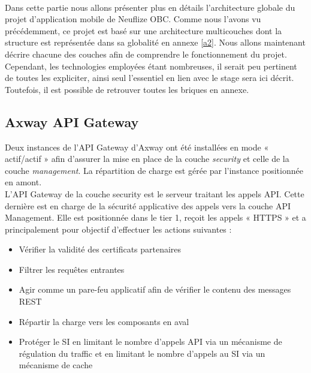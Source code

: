\paragraph{}
Dans cette partie nous allons présenter plus en détails l'architecture globale du projet d'application mobile de Neuflize OBC. Comme nous l'avons vu précédemment, ce projet est basé sur une architecture multicouches dont la structure est représentée dans sa globalité en annexe \ref{a2}. Nous allons maintenant décrire chacune des couches afin de comprendre le fonctionnement du projet. Cependant, les technologies employées étant nombreuses, il serait peu pertinent de toutes les expliciter, ainsi seul l'essentiel en lien avec le stage sera ici décrit. Toutefois, il est possible de retrouver toutes les briques en annexe.

\subsection{Axway API Gateway}
\label{axway}

	Deux instances de l'API Gateway d'Axway ont été installées en mode « actif/actif » afin d'assurer la mise en place de la couche \textit{security} et celle de la couche \textit{management}. La répartition de charge est gérée par l'instance positionnée en amont. \\
		
	L'API Gateway de la couche security est le serveur traitant les appels API. Cette dernière est en charge de la sécurité applicative des appels vers la couche API Management. Elle est positionnée dans le tier 1, reçoit les appels « HTTPS » et a principalement pour objectif d’effectuer les actions suivantes : \\
	
	\begin{itemize}
		\item Vérifier la validité des certificats partenaires
		\item Filtrer les requêtes entrantes 
		\item Agir comme un pare-feu applicatif afin de vérifier le contenu des messages REST
		\item Répartir la charge vers les composants en aval
		\item Protéger le SI en limitant le nombre d’appels API via un mécanisme de régulation du traffic et en limitant le nombre d'appels au SI via un mécanisme de cache \\
	\end{itemize}
	
